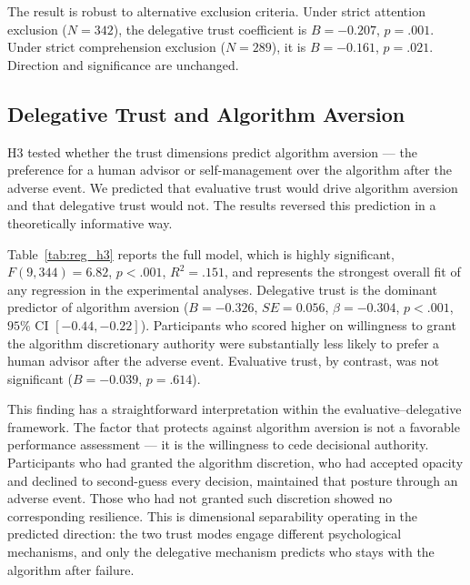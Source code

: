 The result is robust to alternative exclusion criteria. Under strict attention exclusion ($N = 342$), the delegative trust coefficient is $B = -0.207$, $p = .001$. Under strict comprehension exclusion ($N = 289$), it is $B = -0.161$, $p = .021$. Direction and significance are unchanged.

\subsection{Delegative Trust and Algorithm Aversion}

H3 tested whether the trust dimensions predict algorithm aversion --- the preference for a human advisor or self-management over the algorithm after the adverse event. We predicted that evaluative trust would drive algorithm aversion and that delegative trust would not. The results reversed this prediction in a theoretically informative way.

Table~\ref{tab:reg_h3} reports the full model, which is highly significant, $F(9, 344) = 6.82$, $p < .001$, $R^2 = .151$, and represents the strongest overall fit of any regression in the experimental analyses. Delegative trust is the dominant predictor of algorithm aversion ($B = -0.326$, $SE = 0.056$, $\beta = -0.304$, $p < .001$, $95\%$ CI $[-0.44, -0.22]$). Participants who scored higher on willingness to grant the algorithm discretionary authority were substantially less likely to prefer a human advisor after the adverse event. Evaluative trust, by contrast, was not significant ($B = -0.039$, $p = .614$).



This finding has a straightforward interpretation within the evaluative--delegative framework. The factor that protects against algorithm aversion is not a favorable performance assessment --- it is the willingness to cede decisional authority. Participants who had granted the algorithm discretion, who had accepted opacity and declined to second-guess every decision, maintained that posture through an adverse event. Those who had not granted such discretion showed no corresponding resilience. This is dimensional separability operating in the predicted direction: the two trust modes engage different psychological mechanisms, and only the delegative mechanism predicts who stays with the algorithm after failure.

